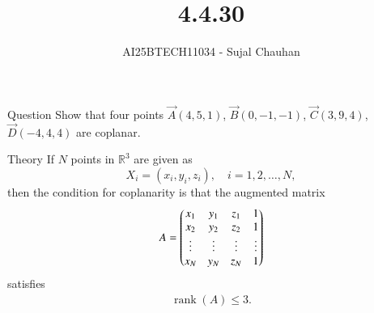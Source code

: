 \documentclass{beamer}
\title
{4.4.30}
\author 
{AI25BTECH11034 - Sujal Chauhan }
\begin{document}
\frame{\titlepage}
\begin{frame}{Question}
Show that four points $\vec{A}(4,5,1)$, $\vec{B}(0,-1,-1)$, $\vec{C}(3,9,4)$, $\vec{D}(-4,4,4)$ are coplanar.




\end{frame}

\begin{frame}{Theory}
    If $N$ points in $\mathbb{R}^3$ are given as 
\[
X_i = (x_i, y_i, z_i), \quad i = 1,2,\dots,N,
\] 
then the condition for coplanarity is that the augmented matrix
\begin{align}
A = \begin{pmatrix}
x_1 & y_1 & z_1 & 1 \\
x_2 & y_2 & z_2 & 1 \\
\vdots & \vdots & \vdots & \vdots \\
x_N & y_N & z_N & 1
\end{pmatrix}
\end{align}
satisfies
\begin{align}
\operatorname{rank}(A) \leq 3.
\end{align}


\end{frame}
\end{document}
